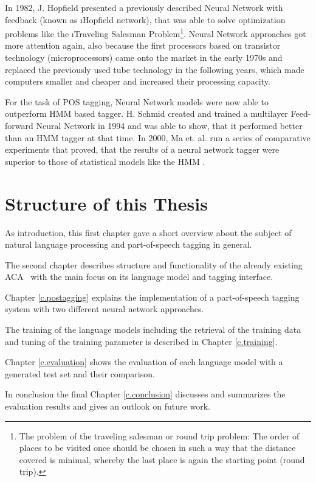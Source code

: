 In 1982, J. Hopfield presented a previously described Neural Network with feedback (known as \i{Hopfield network}), that was able to solve optimization problems like the \i{Traveling Salesman Problem}\footnote{The problem of the traveling salesman or round trip problem: The order of places to be visited once should be chosen in such a way that the distance covered is minimal, whereby the last place is again the starting point (round trip).}. Neural Network approaches got more attention again, also because the first processors based on transistor technology (microprocessors) came onto the market in the early 1970s and replaced the previously used tube technology in the following years, which made computers smaller and cheaper and increased their processing capacity.

For the task of POS tagging, Neural Network models were now able to outperform HMM based tagger. H. Schmid created and trained a multilayer Feed-forward Neural Network in 1994 and was able to show, that it performed better than an HMM tagger \cite{schmid1994} at that time. In 2000, Ma et. al. run a series of comparative experiments that proved, that the results of a neural network tagger were superior to those of statistical models like the HMM \cite{ma2000}.

\section{Structure of this Thesis}\label{c.introduction.structure}
As introduction, this first chapter gave a short overview about the subject of natural language processing and part-of-speech tagging in general.

The second chapter describes structure and functionality of the already existing ACA \Alex\ with the main focus on its language model and tagging interface.

Chapter \ref{c.postagging} explains the implementation of a part-of-speech tagging system with two different neural network approaches.

The training of the language models including the retrieval of the training data and tuning of the training parameter is described in Chapter \ref{c.training}.

Chapter \ref{c.evaluation} shows the evaluation of each language model with a generated test set and their comparison.

In conclusion the final Chapter \ref{c.conclusion} discusses and summarizes the evaluation results and gives an outlook on future work.

